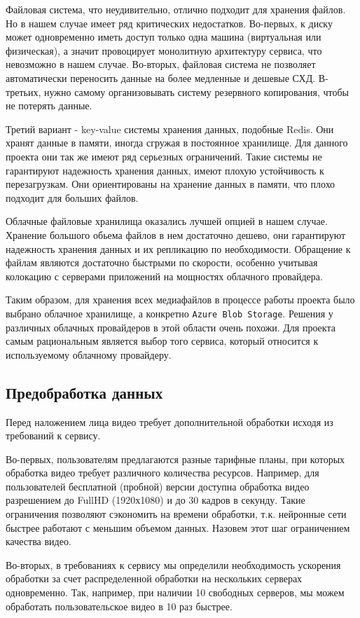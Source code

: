 Файловая система, что неудивительно, отлично подходит для хранения файлов. Но в нашем случае имеет ряд критических недостатков. Во-первых, к диску может одновременно иметь доступ только одна машина (виртуальная или физическая), а значит провоцирует монолитную архитектуру сервиса, что невозможно в нашем случае. Во-вторых, файловая система не позволяет автоматически переносить данные на более медленные и дешевые СХД. В-третьих, нужно самому организовывать систему резервного копирования, чтобы не потерять данные.

Третий вариант - key-value системы хранения данных, подобные Redis. Они хранят данные в памяти, иногда сгружая в постоянное хранилище. Для данного проекта они так же имеют ряд серьезных ограничений. Такие системы не гарантируют надежность хранения данных, имеют плохую устойчивость к перезагрузкам. Они ориентированы на хранение данных в памяти, что плохо подходит для больших файлов.

Облачные файловые хранилища оказались лучшей опцией в нашем случае. Хранение большого обьема файлов в нем достаточно дешево, они гарантируют надежность хранения данных и их репликацию по необходимости. Обращение к файлам являются достаточно быстрыми по скорости, особенно учитывая колокацию с серверами приложений на мощностях облачного провайдера.

Таким образом, для хранения всех медиафайлов в процессе работы проекта было выбрано облачное хранилище, а конкретно \texttt{Azure Blob Storage}. Решения у различных облачных провайдеров в этой области очень похожи. Для проекта самым рациональным является выбор того сервиса, который относится к используемому облачному провайдеру.

\subsection{Предобработка данных}

Перед наложением лица видео требует дополнительной обработки исходя из требований к сервису.

Во-первых, пользователям предлагаются разные тарифные планы, при которых обработка видео требует различного количества ресурсов. Например, для пользователей бесплатной (пробной) версии доступна обработка видео разрешением до FullHD (1920х1080) и до 30 кадров в секунду. Такие ограничения позволяют сэкономить на времени обработки, т.к. нейронные сети быстрее работают с меньшим объемом данных. Назовем этот шаг ограничением качества видео.

Во-вторых, в требованиях к сервису мы определили необходимость ускорения обработки за счет распределенной обработки на нескольких серверах одновременно. Так, например, при наличии 10 свободных серверов, мы можем обработать пользовательское видео в 10 раз быстрее.

